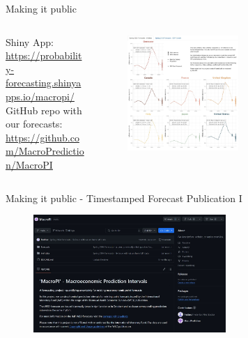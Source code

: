 \documentclass[en]{sdqbeamer}
\begin{document}
\begin{frame}{Making it public}
\begin{columns}
\begin{column}{0.3\textwidth}
Shiny App: \\
   \url{https://probability-forecasting.shinyapps.io/macropi/} \vspace{0.5cm} \\ 
GitHub repo with our forecasts: \\
    \url{https://github.com/MacroPrediction/MacroPI}
    \vspace*{2cm}
\end{column}
\begin{column}{0.7\textwidth}
\vspace*{-10mm}
    \begin{figure}
        \includegraphics[width=0.55\textwidth]{figures/shinycap_final.jpg}
        \label{fig:enter-label}
    \end{figure}   
\end{column}
\end{columns}

\end{frame}

\begin{frame}{Making it public - Timestamped Forecast Publication I}

    \begin{figure}
        \includegraphics[width=0.65\textwidth]{figures/Capture_GitHub.jpg}
        \label{fig:enter-label}
    \end{figure}   

\end{frame}
\end{document}
